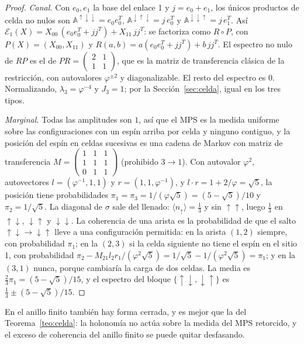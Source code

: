 \documentclass[11pt,a4paper]{article}
\theoremstyle{remark}
\newcommand{\ev}[1]{\langle #1\rangle}
\begin{document}
\begin{proof}
\emph{Canal.} Con $e_0,e_1$ la base del enlace 1 y $j=e_0+e_1$, los únicos productos de celda no
nulos son $\mathbb A^{\uparrow\downarrow\downarrow}=e_0e_0^T$,
$\mathbb A^{\downarrow\uparrow\downarrow}=j\,e_0^T$ y $\mathbb A^{\downarrow\downarrow\uparrow}=j\,e_1^T$.
Así $\mathcal E_1(X)=X_{00}\,(e_0e_0^T+jj^T)+X_{11}\,jj^T$: se factoriza como $R\circ P$, con
$P(X)=(X_{00},X_{11})$ y $R(a,b)=a(e_0e_0^T+jj^T)+b\,jj^T$. El espectro no nulo de $RP$ es el de
$PR=\left(\begin{smallmatrix}2&1\\1&1\end{smallmatrix}\right)$, que es la matriz de transferencia
clásica de la restricción, con autovalores $\varphi^{\pm2}$ y diagonalizable. El resto del espectro
es $0$. Normalizando, $\lambda_3=\varphi^{-4}$ y $J_3=1$; por la Sección~\ref{sec:celda}, igual
en los tres tipos.

\emph{Marginal.} Todas las amplitudes son $1$, así que el MPS es la medida uniforme sobre las
configuraciones con un espín arriba por celda y ninguno contiguo, y la posición del espín en
celdas sucesivas es una cadena de Markov con matriz de transferencia
$M=\left(\begin{smallmatrix}1&1&1\\1&1&1\\0&1&1\end{smallmatrix}\right)$ (prohibido $3\to1$).
Con autovalor $\varphi^2$, autovectores $l=(\varphi^{-1},1,1)$ y $r=(1,1,\varphi^{-1})$, y
$l\cdot r=1+2/\varphi=\sqrt5$, la posición tiene probabilidades
$\pi_1=\pi_3=1/(\varphi\sqrt5)=(5-\sqrt5)/10$ y $\pi_2=1/\sqrt5$. La diagonal de $\sigma$ sale del
llenado: $\ev{n_\uparrow}=\tfrac13$ y sin $\uparrow\uparrow$, luego $\tfrac13$ en
$\uparrow\downarrow$, $\downarrow\uparrow$ y $\downarrow\downarrow$. La coherencia de una arista es
la probabilidad de que el salto $\uparrow\downarrow\to\downarrow\uparrow$ lleve a una configuración
permitida: en la arista $(1,2)$ siempre, con probabilidad $\pi_1$; en la $(2,3)$ si la celda
siguiente no tiene el espín en el sitio 1, con probabilidad
$\pi_2-M_{21}l_2r_1/(\varphi^2\sqrt5)=1/\sqrt5-1/(\varphi^2\sqrt5)=\pi_1$; y en la $(3,1)$ nunca,
porque cambiaría la carga de dos celdas. La media es $\tfrac23\pi_1=(5-\sqrt5)/15$, y el espectro
del bloque $\{\uparrow\downarrow,\downarrow\uparrow\}$ es $\tfrac13\pm(5-\sqrt5)/15$.
\end{proof}

En el anillo finito también hay forma cerrada, y es mejor que la del Teorema~\ref{teo:celda}: la
holonomía no actúa sobre la medida del MPS retorcido, y el exceso de coherencia del anillo finito
se puede quitar desfasando.
\end{document}
